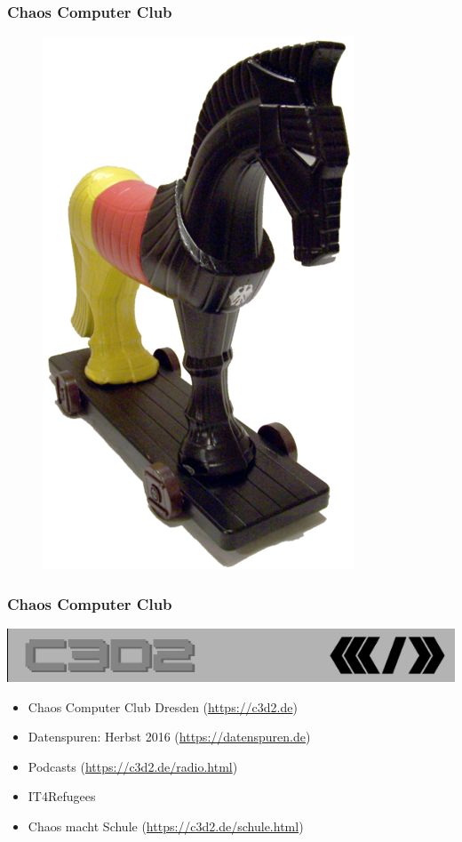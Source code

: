 \documentclass[12pt, xcolor={svgnames,table}]{beamer}
\begin{document}
\begin{frame}
  \frametitle{Chaos Computer Club}
  \begin{figure}
    \includegraphics[height=0.7\textheight]{img/trojaner.png}
  \end{figure}
\end{frame}

\begin{frame}
    \frametitle{Chaos Computer Club}
    \begin{center}
	\includegraphics[height=0.1\textheight]{img/c3d2_logo.png}
    \end{center}
    \begin{itemize}
      \item<1-> Chaos Computer Club Dresden (\url{https://c3d2.de})
      \item<2-> Datenspuren: Herbst 2016 (\url{https://datenspuren.de})
      \item<3-> Podcasts (\url{https://c3d2.de/radio.html})
      \item<4-> IT4Refugees
      \item<5-> Chaos macht Schule (\url{https://c3d2.de/schule.html})
    \end{itemize}
\end{frame}
\end{document}
